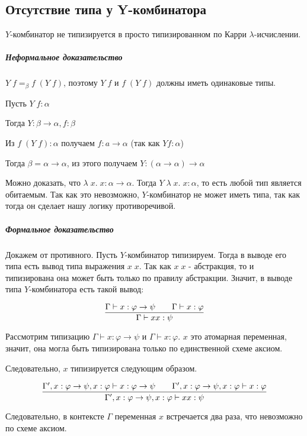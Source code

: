 \subsection{Отсутствие типа у Y-комбинатора}

\begin{theorem}
	$Y$-комбинатор не типизируется в просто типизированном по Карри $\lambda$-исчислении.
\end{theorem}

\subparagraph{Неформальное доказательство}

$Y \; f =_{\beta} f \; (Y \; f)$, поэтому $Y \; f$ и $f \; (Y \; f)$ должны иметь одинаковые типы.

Пусть $Y \; f : \alpha$

Тогда $Y : \beta \rightarrow \alpha, f : \beta$

Из $f \; (Y \; f) : \alpha$ получаем $f: a \rightarrow \alpha$ (так как $Y f : \alpha$)

Тогда $\beta = \alpha \rightarrow \alpha$, из этого получаем $Y : (\alpha \rightarrow \alpha) \rightarrow \alpha$

Можно доказать, что $\lambda \; x. \; x : \alpha \rightarrow \alpha$. Тогда $Y \; \lambda \; x. \; x : \alpha$, то есть любой тип является обитаемым. Так как это невозможно, $Y$-комбинатор не может иметь типа, так как тогда он сделает нашу логику противоречивой.

\subparagraph{Формальное доказательство}

Докажем от противного. Пусть $Y$-комбинатор типизируем. Тогда в выводе его типа есть вывод типа выражения $x \; x$. Так как $x \; x$ - абстракция, то и типизирована она может быть только по правилу абстракции. Значит, в выводе типа $Y$-комбинатора есть такой вывод:

$$\infer{\Gamma \vdash x x: \psi}{\Gamma \vdash x: \varphi \rightarrow \psi && \Gamma \vdash x: \varphi }$$

Рассмотрим типизацию $\Gamma \vdash x: \varphi \rightarrow \psi$ и $\Gamma \vdash x: \varphi$. $x$ это атомарная переменная, значит, она могла быть типизирована только по единственной схеме аксиом. 

Следовательно, $x$ типизируется следующим образом.

$$\infer{\Gamma', x: \varphi \rightarrow \psi, x: \varphi \vdash x x: \psi}{\Gamma', x: \varphi \rightarrow \psi, x: \varphi \vdash x: \varphi \rightarrow \psi && \Gamma', x: \varphi \rightarrow \psi, x: \varphi \vdash x: \varphi }$$

Следовательно, в контексте $\Gamma$ переменная $x$ встречается два раза, что невозможно по схеме аксиом.

